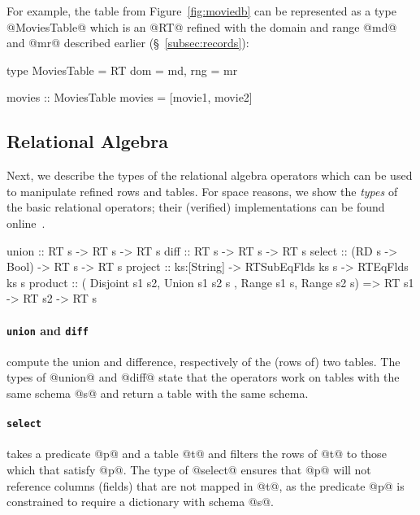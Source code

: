 For example, the table from Figure~\ref{fig:moviedb}
can be represented as a type @MoviesTable@ which 
is an @RT@ refined with the domain and range @md@ 
and @mr@ described earlier (\S~\ref{subsec:records}):
%
\begin{code}
  type MoviesTable = RT {dom = md, rng = mr}
   
  movies :: MoviesTable 
  movies = [movie1, movie2]
\end{code}

\subsection{Relational Algebra}\label{subsec:relational}

Next, we describe the types of the relational algebra operators
which can be used to manipulate refined rows and tables.
For space reasons, we show the \emph{types} of the basic 
relational operators; their (verified) implementations 
can be found online~\cite{liquidhaskellgithub}.
%
\begin{code}
  union   :: RT s -> RT s -> RT s
  diff    :: RT s -> RT s -> RT s
  select  :: (RD s -> Bool) -> RT s -> RT s
  project :: ks:[String] -> RTSubEqFlds ks s 
          -> RTEqFlds ks s
  product :: ( Disjoint s1 s2, Union s1 s2 s
             , Range s1 s, Range s2 s) 
          => RT s1 -> RT s2 -> RT s
\end{code}

\paragraph{\texttt{union} and \texttt{diff}} compute the union 
and difference, respectively of the (rows of) two tables.
%
The types of @union@ and @diff@ state that the 
operators work on tables with the same schema 
@s@ and return a table with the same schema.

\paragraph{\texttt{select}} takes a predicate @p@
and a table @t@ and filters the rows of @t@ 
to those which that satisfy @p@.
%
The type of @select@ ensures that @p@ will 
not reference columns (fields) that are
not mapped in @t@, as the predicate @p@
is constrained to require a dictionary 
with schema @s@.

